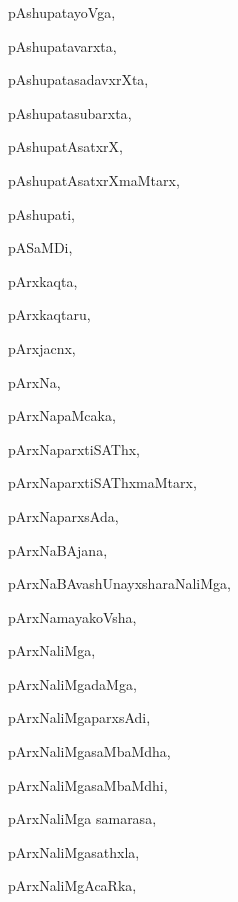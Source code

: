 \begin{multicols}{3}
{\noindent
{pAshupatayoVga}, \pageref{pAshupatayoVga}

\noindent
{pAshupatavarxta}, \pageref{pAshupatavarxta}

\noindent
{pAshupatasadavxrXta}, \pageref{pAshupatasadavxrXta}

\noindent
{pAshupatasubarxta}, \pageref{pAshupatasubarxta}

\noindent
{pAshupatAsatxrX}, \pageref{pAshupatAsatxrX}

\noindent
{pAshupatAsatxrXmaMtarx}, \pageref{pAshupatAsatxrXmaMtarx}

\noindent
{pAshupati}, \pageref{pAshupati}

\noindent
{pASaMDi}, \pageref{pASaMDi}

\noindent
{pArxkaqta}, \pageref{pArxkaqta}

\noindent
{pArxkaqtaru}, \pageref{pArxkaqtaru}

\noindent
{pArxjacnx}, \pageref{pArxjacnx}

\noindent
{pArxNa}, \pageref{pArxNa}

\noindent
{pArxNapaMcaka}, \pageref{pArxNapaMcaka}

\noindent
{pArxNaparxtiSAThx}, \pageref{pArxNaparxtiSAThx}

\noindent
{pArxNaparxtiSAThxmaMtarx}, \pageref{pArxNaparxtiSAThxmaMtarx}

\noindent
{pArxNaparxsAda}, \pageref{pArxNaparxsAda}

\noindent
{pArxNaBAjana}, \pageref{pArxNaBAjana}

\noindent
{pArxNaBAvashUnayxsharaNaliMga}, \pageref{pArxNaBAvashUnayxsharaNaliMga}

\noindent
{pArxNamayakoVsha}, \pageref{pArxNamayakoVsha}

\noindent
{pArxNaliMga}, \pageref{pArxNaliMga}

\noindent
{pArxNaliMgadaMga}, \pageref{pArxNaliMgadaMga}

\noindent
{pArxNaliMgaparxsAdi}, \pageref{pArxNaliMgaparxsAdi}

\noindent
{pArxNaliMgasaMbaMdha}, \pageref{pArxNaliMgasaMbaMdha}

\noindent
{pArxNaliMgasaMbaMdhi}, \pageref{pArxNaliMgasaMbaMdhi}

\noindent
{pArxNaliMga samarasa}, \pageref{pArxNaliMga samarasa}

\noindent
{pArxNaliMgasathxla}, \pageref{pArxNaliMgasathxla}

\noindent
{pArxNaliMgAcaRka}, \pageref{pArxNaliMgAcaRka}

}
\end{multicols}
